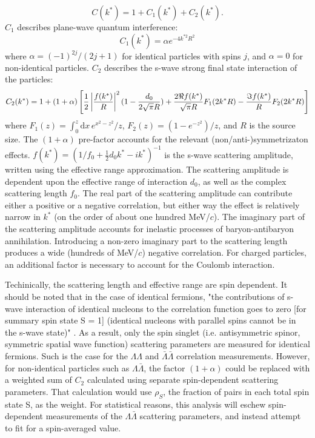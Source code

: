 \begin{equation}
C(k^*)= 1 + C_1(k^*)+C_2(k^*).
\end{equation}
$C_1$ describes plane-wave quantum interference:
\begin{equation}
C_1(k^*) = \alpha e^{-4k^{*2}R^2}
\end{equation}
where $\alpha = (-1)^{2j}/(2j+1)$ for identical particles with spins $j$, and $\alpha = 0$ for non-identical particles.  $C_2$ describes the s-wave strong final state interaction of the particles:
\begin{equation}
\label{eq:Lednicky}
C_2(k^*)= 1+ (1+\alpha)\left[\frac{1}{2}\left\lvert\frac{f(k^*)}{R}\right\rvert^2(1-\frac{d_0}{2\sqrt{\pi}R})+\frac{2\Re f(k^*)}{\sqrt{\pi}R}F_1(2k^*R)-\frac{\Im f(k^*)}{R}F_2(2k^*R)\right]
\end{equation}
where $F_1(z) = \int_0^z \! \mathrm{d}x \, e^{x^2-z^2}/z$,  $F_2(z) = (1-e^{-z^2})/z$, and $R$ is the source size. The $(1+\alpha)$ pre-factor accounts for the relevant (non/anti-)symmetrizaton effects.  $f(k^*)=(1/f_0+\frac{1}{2}d_0k^*-ik^*)^{-1}$ is the s-wave scattering amplitude, written using the effective range approximation.  The scattering amplitude is dependent upon the effective range of interaction $d_0$, as well as the complex scattering length $f_0$.  The real part of the scattering amplitude can contribute either a positive or a negative correlation, but either way the effect is relatively narrow in $k^*$ (on the order of about one hundred MeV/$c$).  The imaginary part of the scattering amplitude accounts for inelastic processes of baryon-antibaryon annihilation.  Introducing a non-zero imaginary part to the scattering length produces a wide (hundreds of MeV/$c$) negative correlation.  For charged particles, an additional factor \cite{Aamodt:2011kd} is necessary to account for the Coulomb interaction.

Techinically, the scattering length and effective range are spin dependent.  It should be noted that in the case of identical fermions, "the contributions of s-wave interaction of identical nucleons to the correlation function goes to zero [for summary spin state S = 1] (identical nucleons with parallel spins cannot be in the s-wave state)" \cite{lednicky82}.  As a result, only the spin singlet (i.e. antisymmetric spinor, symmetric spatial wave function) scattering parameters are measured for identical fermions.  Such is the case for the $\Lambda\Lambda$ and $\bar{\Lambda}\bar{\Lambda}$ correlation measurements.  However, for non-identical particles such as $\Lambda\bar{\Lambda}$, the factor $(1+\alpha)$ could be replaced with a weighted sum of $C_2$ calculated using separate spin-dependent scattering parameters.  That calculation would use $\rho_S$, the fraction of pairs in each total spin state S, as the weight.  For statistical reasons, this analysis will eschew spin-dependent measurements of the $\Lambda\bar{\Lambda}$ scattering parameters, and instead attempt to fit for a spin-averaged value.


